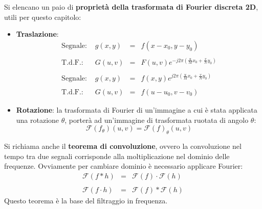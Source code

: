 \documentclass[a4paper]{article}
\begin{document}
	\noindent
	Si elencano un paio di \textbf{proprietà della trasformata di Fourier discreta 2D}, utili per questo capitolo:
	\begin{itemize}
		\item \textbf{Traslazione}:
		\begin{equation*}
			\begin{array}{llll}
				\text{Segnale: } & g\left(x,y\right) & = & f\left(x-x_{0}, y-y_{0}\right) \\
				&&& \\
				\text{T.d.F.:}   & G\left(u,v\right) & = & F\left(u,v\right) e^{-j 2 \pi \left(\frac{u}{M}x_{0} + \frac{v}{N}y_{0}\right)} \\
				&&& \\
				\text{Segnale: } & g\left(x,y\right) & = & f\left(x,y\right)e^{j2\pi \left(\frac{u}{M}x_{0} + \frac{v}{N}y_{0}\right)} \\
				&&& \\
				\text{T.d.F.:}   & G\left(u,v\right) & = & f\left(u-u_{0}, v-v_{0}\right)
			\end{array}
		\end{equation*}
		
		\item \textbf{Rotazione}: la trasformata di Fourier di un'immagine a cui è stata applicata una rotazione $\theta$, porterà ad un'immagine di trasformata ruotata di angolo $\theta$:
		\begin{equation*}
			\mathcal{F}\left(f_{\theta}\right)\left(u,v\right) = \mathcal{F}\left(f\right)_{\theta}\left(u,v\right)
		\end{equation*}
	\end{itemize}

	\noindent
	Si richiama anche il \textbf{teorema di convoluzione}, ovvero la convoluzione nel tempo tra due segnali corrisponde alla moltiplicazione nel dominio delle frequenze. Ovviamente per cambiare dominio è necessario applicare Fourier:
	\begin{equation*}
		\begin{array}{lll}
			\mathcal{F}\left(f * h\right) & = & \mathcal{F}\left(f\right) \cdot \mathcal{F}\left(h\right) \\
			&& \\
			\mathcal{F}\left(f \cdot h\right) & = & \mathcal{F}\left(f\right) * \mathcal{F}\left(h\right)
		\end{array}
	\end{equation*}
	Questo teorema è la base del filtraggio in frequenza.\newpage
	
\end{document}
